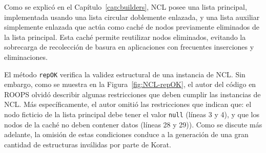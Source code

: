 Como se explicó en el Capítulo~\ref{cap:builders}, NCL posee una lista
principal, implementada usando una lista circular doblemente enlazada, 
y una lista auxiliar simplemente enlazada que actúa como caché de nodos
previamente eliminados de la lista principal. Esta caché permite reutilizar 
nodos eliminados, evitando la sobrecarga de recolección de basura en aplicaciones con frecuentes inserciones y eliminaciones.

El método \texttt{repOK} verifica la validez estructural de una instancia de
NCL. Sin embargo, como se muestra en la Figura~\ref{fig:NCL-repOK}, el
autor del código en ROOPS olvidó describir algunas restricciones que deben
cumplir las instancias de NCL. Más específicamente, el autor omitió las
restricciones que indican que: el nodo ficticio de la lista principal debe tener el
valor \texttt{null} (líneas 3 y 4), y que los nodos de la caché no deben 
contener datos (líneas 28 y 29)). Como se discute más adelante, la omisión de estas 
condiciones conduce a la generación de una gran cantidad de estructuras
inválidas por parte de Korat.

